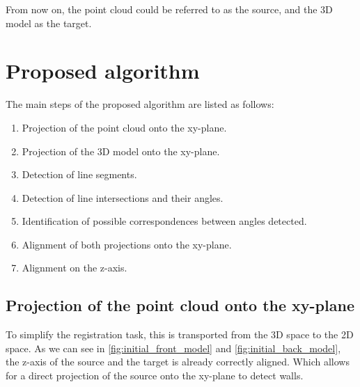         From now on, the point cloud could be referred to as the source, and the 3D model as the target.
     
    \section{Proposed algorithm}
        The main steps of the proposed algorithm are listed as follows:
        \begin{enumerate}
            \itemsep 0em 
            \item Projection of the point cloud onto the xy-plane.
            \item Projection of the 3D model onto the xy-plane.
            \item Detection of line segments.
            \item Detection of line intersections and their angles.
            \item Identification of possible correspondences between angles detected.
            \item Alignment of both projections onto the xy-plane.
            \item Alignment on the z-axis.
        \end{enumerate}

        \subsection{Projection of the point cloud onto the xy-plane}
        \label{sub:Projection of the point cloud onto the xy-plane}
            To simplify the registration task, this is transported from the 3D space to the 2D space.
            As we can see in \autoref{fig:initial_front_model} and \autoref{fig:initial_back_model}, 
            the z-axis of the source and the target is already correctly aligned.
            Which allows for a direct projection of the source onto the xy-plane to detect walls.


